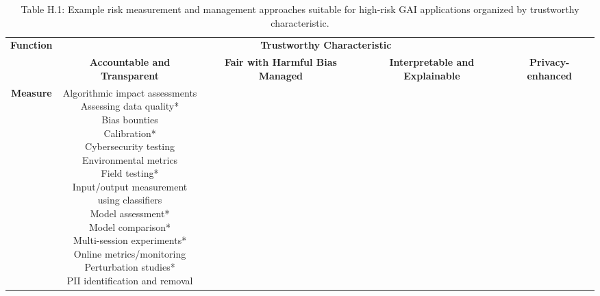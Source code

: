 \documentclass[fleqn]{article}
\begin{document}
\begin{landscape}
\begin{table}[H]
	\caption*{Table H.1: Example risk measurement and management approaches suitable for high-risk GAI applications organized by trustworthy characteristic.}
	\footnotesize
	\begin{tabular}{|c|c|c|c|c|}
		\hline
		\multirow{2}{*}{\textbf{Function}} & \multicolumn{4}{|c|}{\textbf{Trustworthy Characteristic}}   \\
		\cline{2-5}
		& \textbf{Accountable and Transparent} & \textbf{Fair with Harmful Bias Managed} & \textbf{Interpretable and Explainable} & \textbf{Privacy-enhanced} \\
		\hline
		\textbf{Measure} & \makecell[l]{
			\textbullet\hspace{3pt} Algorithmic impact assessments \\ 
			\textbullet\hspace{3pt} Assessing data quality*\\ 
			\textbullet\hspace{3pt} Bias bounties \\ 
			\textbullet\hspace{3pt} Calibration*\\ 
			\textbullet\hspace{3pt} Cybersecurity testing \\ 
			\textbullet\hspace{3pt} Environmental metrics \\ 
			\textbullet\hspace{3pt} Field testing*\\ 
			\textbullet\hspace{3pt} Input/output measurement\\\hspace{10pt}using classifiers \\ 
			\textbullet\hspace{3pt} Model assessment*\\ 
			\textbullet\hspace{3pt} Model comparison*\\ 
			\textbullet\hspace{3pt} Multi-session experiments*\\ 
			\textbullet\hspace{3pt} Online metrics/monitoring \\ 
			\textbullet\hspace{3pt} Perturbation studies*\\ 
			\textbullet\hspace{3pt} PII identification and removal \\ 
}
\end{tabular}
\end{table}
\end{landscape}
\end{document}
